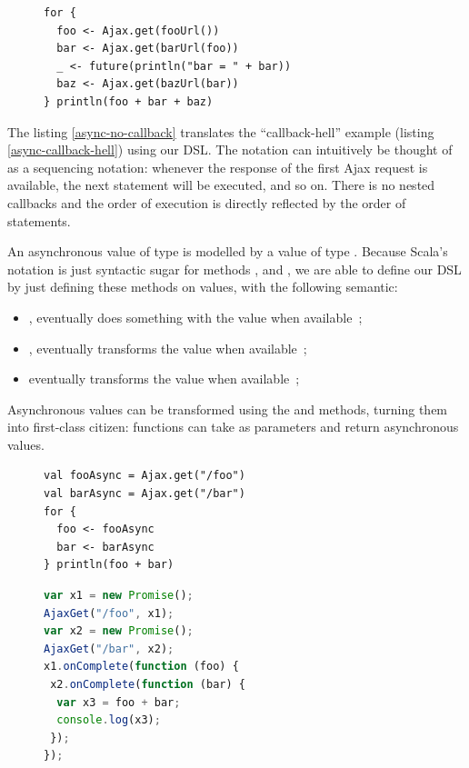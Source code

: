 \documentclass[american,english,runningheads]{llncs}
\begin{document}
\begin{figure}
\centering
\begin{lstlisting}[caption=No callback hell,label=async-no-callback]
for {
  foo <- Ajax.get(fooUrl())
  bar <- Ajax.get(barUrl(foo))
  _ <- future(println("bar = " + bar))
  baz <- Ajax.get(bazUrl(bar))
} println(foo + bar + baz)
\end{lstlisting}
\end{figure}

The listing \ref{async-no-callback} translates the “callback-hell” example (listing \ref{async-callback-hell}) using
our DSL. The  notation can intuitively be thought of as a sequencing notation: whenever the response of the
first Ajax request is available, the next statement will be executed, and so on. There is no nested callbacks and the
order of execution is directly reflected by the order of statements.

An asynchronous value of type  is modelled by a value of type . Because Scala’s
 notation is just syntactic sugar for methods ,  and , we are
able to define our DSL by just defining these methods on  values, with the following semantic:
\begin{itemize}
\item {}, eventually does something with the value when available~;
\item {}, eventually transforms the value when available~;
\item {} eventually transforms the value when available~;
\end{itemize}

Asynchronous values can be transformed using the  and  methods, turning them into first-class
citizen: functions can take as parameters and return asynchronous values.

\begin{figure}
\begin{multicols}{2}
\begin{lstlisting}[caption=Parallel computations in Scala,label=async-parallel-1]
val fooAsync = Ajax.get("/foo")
val barAsync = Ajax.get("/bar")
for {
  foo <- fooAsync
  bar <- barAsync
} println(foo + bar)
\end{lstlisting}
\vfill
\columnbreak
\begin{lstlisting}[language=JavaScript,caption=Generated JavaScript code,label=async-parallel-2]
var x1 = new Promise();
AjaxGet("/foo", x1);
var x2 = new Promise();
AjaxGet("/bar", x2);
x1.onComplete(function (foo) {
 x2.onComplete(function (bar) {
  var x3 = foo + bar;
  console.log(x3);
 });
});
\end{lstlisting}
\end{multicols}
\end{figure}
\end{document}
